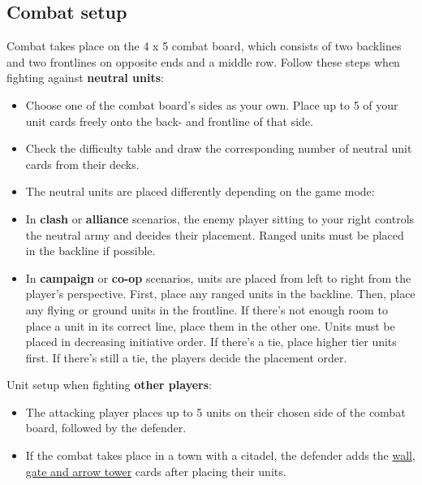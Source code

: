 \documentclass[12pt]{article}
\begin{document}
\subsection*{\hypertarget{Combatsetup}{Combat setup}}

Combat takes place on the 4 x 5 combat board, which consists of two backlines and two frontlines on opposite ends and a middle row. Follow these steps when fighting against \textbf{neutral units}:

\begin{itemize}
 \item Choose one of the combat board’s sides as your own. Place up to 5 of your unit cards freely onto the back- and frontline of that side.
  \item Check the difficulty table and draw the corresponding number of neutral unit cards from their decks.
  \item The neutral units are placed differently depending on the game mode:
        \item In \textbf{clash} or \textbf{alliance} scenarios, the enemy player sitting to your right controls the neutral army and decides their placement. Ranged units must be placed in the backline if possible.
        \item In \textbf{campaign} or \textbf{co-op} scenarios, units are placed from left to right from the player's perspective. First, place any ranged units in the backline. Then, place any flying or ground units in the frontline. If there's not enough room to place a unit in its correct line, place them in the other one. Units must be placed in decreasing initiative order. If there's a tie, place higher tier units first. If there's still a tie, the players decide the placement order.
\end{itemize}
\begin{minipage}{.6\textwidth}
Unit setup when fighting \textbf{other players}:
    \begin{itemize}[wide]
      \item The attacking player places up to 5 units on their chosen side of the combat board, followed by the defender.
      \item If the combat takes place in a town with a citadel, the defender adds the \hyperlink{Walls}{wall, gate and arrow tower} cards after placing their units.
    \end{itemize}
  \end{minipage}

\clearpage
\end{document}
